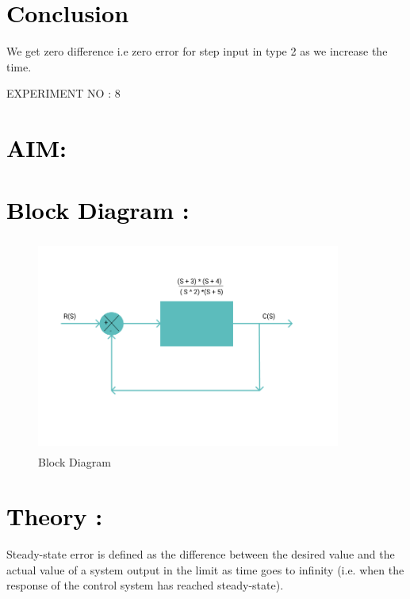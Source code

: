 \documentclass[12pt]{article}
\begin{document}
\section*{\textcolor{black}{Conclusion}}
 We get zero difference i.e zero error for step input in type 2 as we increase the time.
    \pagebreak
\maketitle
\begin{center}
    \LARGE {EXPERIMENT NO : 8}
             
\end{center}

\section*{\textcolor{black}{AIM: }}

\section*{\textcolor{black}{Block Diagram :}}

\begin{figure}[!hth]
        \centering
        \includegraphics[width =10cm, height = 7cm]{images/exp8.png}
        \caption{Block Diagram}
        \label{Graph}
\end{figure}

\section*{\textcolor{black}{Theory :}}
Steady-state error is defined as the difference between the desired value and the actual value of a system output in the limit as time goes to infinity (i.e. when the response of the control system has reached steady-state).\par
\end{document}
